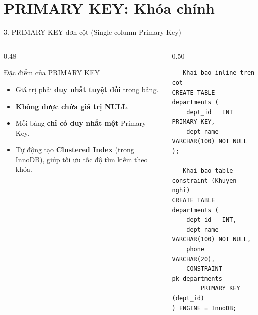 \documentclass[aspectratio=169,11pt]{beamer}
\newcommand{\kw}[1]{\textcolor{dbblue}{\textbf{#1}}}
\begin{document}
\section{PRIMARY KEY: Khóa chính}
\begin{frame}[fragile]{3. PRIMARY KEY đơn cột (Single-column Primary Key)}
\begin{columns}[t]
  \begin{column}{0.48\textwidth}
    \begin{block}{Đặc điểm của PRIMARY KEY}
      \begin{itemize}\setlength{\itemsep}{1.5pt}
        \item Giá trị phải \kw{duy nhất tuyệt đối} trong bảng.
        \item \kw{Không được chứa giá trị NULL}.
        \item Mỗi bảng \kw{chỉ có duy nhất một} Primary Key.
        \item Tự động tạo \kw{Clustered Index} (trong InnoDB), giúp tối ưu tốc độ tìm kiếm theo khóa.
      \end{itemize}
    \end{block}
  \end{column}
  \begin{column}{0.50\textwidth}
\begin{lstlisting}
-- Khai bao inline tren cot
CREATE TABLE departments (
    dept_id   INT PRIMARY KEY,
    dept_name VARCHAR(100) NOT NULL
);

-- Khai bao table constraint (Khuyen nghi)
CREATE TABLE departments (
    dept_id   INT,
    dept_name VARCHAR(100) NOT NULL,
    phone     VARCHAR(20),
    CONSTRAINT pk_departments 
        PRIMARY KEY (dept_id)
) ENGINE = InnoDB;
\end{lstlisting}
  \end{column}
\end{columns}
\end{frame}
\end{document}
